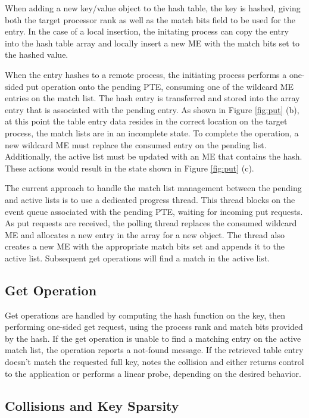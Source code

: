 When adding a new key/value object to the hash table, the key is
hashed, giving both the target processor rank as well as the match
bits field to be used for the entry. In the case of a local insertion,
the initating process can copy the entry into the hash table array and
locally insert a new ME with the match bits set to the hashed value. 

When the entry hashes to a remote process, the initiating process
performs a one-sided put operation onto the pending PTE, consuming one
of the wildcard ME entries on the match list. The hash entry is
transferred and stored into the array entry that is associated with
the pending entry. As shown in Figure \ref{fig:put} (b), at this point
the table entry data resides in the correct location on the target
process, the match lists are in an incomplete state.  To complete the
operation, a new wildcard ME must replace the consumed entry on the
pending list. Additionally, the active list must be updated with an ME
that contains the hash. These actions would result in the state shown
in Figure \ref{fig:put} (c).

The current approach to handle the match list management between the
pending and active lists is to use a dedicated progress thread. This
thread blocks on the event queue associated with the pending PTE,
waiting for incoming put requests. As put requests are received, the
polling thread replaces the consumed wildcard ME and allocates a
new entry in the array for a new object. The thread also creates a new
ME with the appropriate match bits set and appends it to the active
list. Subsequent get operations will find a match in the active list.

\subsection{Get Operation}

Get operations are handled by computing the hash function on the key,
then performing one-sided get request, using the process rank and
match bits provided by the hash. If the get operation is unable to
find a matching entry on the active match list, the operation reports
a not-found message. If the retrieved table entry doesn't match the
requested full key, \pdht notes the collision and either returns
control to the application or performs a linear probe, depending on
the desired behavior.

\subsection{Collisions and Key Sparsity}

